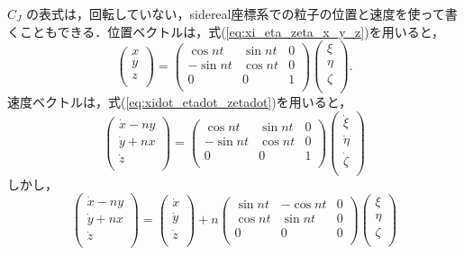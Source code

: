 \documentclass[11pt,a4paper,oneside,onecolumn]{jreport}
\begin{document}
$C_J$ の表式は，回転していない，sidereal座標系での粒子の位置と速度を使って書くこともできる．位置ベクトルは，式(\ref{eq:xi_eta_zeta_x_y_z})を用いると，
\begin{equation}
\begin{pmatrix}
x\\
y\\
z\\
\end{pmatrix}
= 
\begin{pmatrix}
\cos nt & \sin nt & 0\\
- \sin nt & \cos nt & 0\\
0 & 0 & 1\\
\end{pmatrix}
\begin{pmatrix}
\xi\\
\eta\\
\zeta\\
\end{pmatrix}. \label{eq:x_y_z_xi_eta_zeta}
\end{equation}
速度ベクトルは，式(\ref{eq:xidot_etadot_zetadot})を用いると，
\begin{equation}
\begin{pmatrix}
\dot{x} - ny\\
\dot{y} + nx\\
\dot{z}\\
\end{pmatrix}
= 
\begin{pmatrix}
\cos nt & \sin nt & 0\\
- \sin nt & \cos nt & 0\\
0 & 0 & 1\\
\end{pmatrix}
\begin{pmatrix}
\dot{\xi}\\
\dot{\eta}\\
\dot{\zeta}\\
\end{pmatrix} \label{eq:xdot_ydot_zdot_1}
\end{equation}
しかし，
\begin{equation}
\begin{pmatrix}
\dot{x} - ny\\
\dot{y} + nx\\
\dot{z}\\
\end{pmatrix}
= 
\begin{pmatrix}
\dot{x}\\
\dot{y}\\
\dot{z}\\
\end{pmatrix}
+ n
\begin{pmatrix}
\sin nt & - \cos nt & 0\\
\cos nt & \sin nt & 0\\
0 & 0 & 0\\
\end{pmatrix}
\begin{pmatrix}
\xi\\
\eta\\
\zeta\\
\end{pmatrix} \label{eq:xdot_ydot_zdot_2}
\end{equation}
\end{document}
